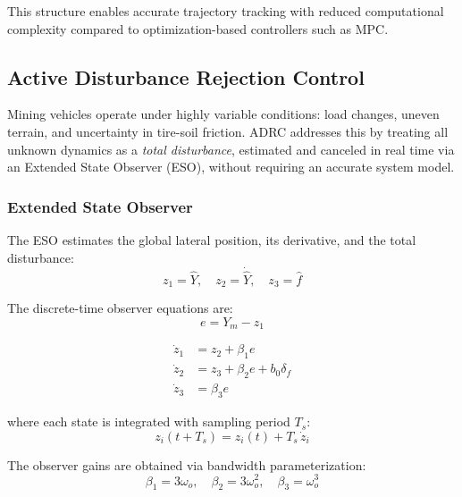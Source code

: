 \documentclass[letterpaper]{ifacconf}
\begin{document}
This structure enables accurate trajectory tracking with reduced computational complexity compared to optimization-based controllers such as MPC.


\subsection{Active Disturbance Rejection Control}
\label{sec:adrc}

Mining vehicles operate under highly variable conditions: load changes, uneven terrain, and uncertainty in tire-soil friction. ADRC addresses this by treating all unknown dynamics as a \emph{total disturbance}, estimated and canceled in real time via an Extended State Observer (ESO), without requiring an accurate system model.

\subsubsection{Extended State Observer} 

The ESO estimates the global lateral position, its derivative, and the total disturbance:
%
\begin{equation}
z_1 = \hat{Y},\quad z_2 = \dot{\hat{Y}},\quad z_3 = \hat{f}
\label{eq:eso_states}
\end{equation}

The discrete-time observer equations are:
%
\begin{equation}
    e = Y_m - z_1 
\end{equation}

\begin{equation}
    \begin{aligned}
        \dot{z}_1 &= z_2 + \beta_1 e \\
        \dot{z}_2 &= z_3 + \beta_2 e + b_0\delta_f\\
        \dot{z}_3 &= \beta_3 e 
    \end{aligned}
\end{equation}


%
where each state is integrated with sampling period $T_s$:
%
\begin{equation}
z_i(t + T_s) = z_i(t) + T_s\,\dot{z}_i
\label{eq:eso_integration}
\end{equation}

The observer gains are obtained via bandwidth parameterization:
%
\begin{equation}
\beta_1 = 3\omega_o,\quad \beta_2 = 3\omega_o^2,\quad \beta_3 = \omega_o^3
\label{eq:eso_gains}
\end{equation}
\end{document}
